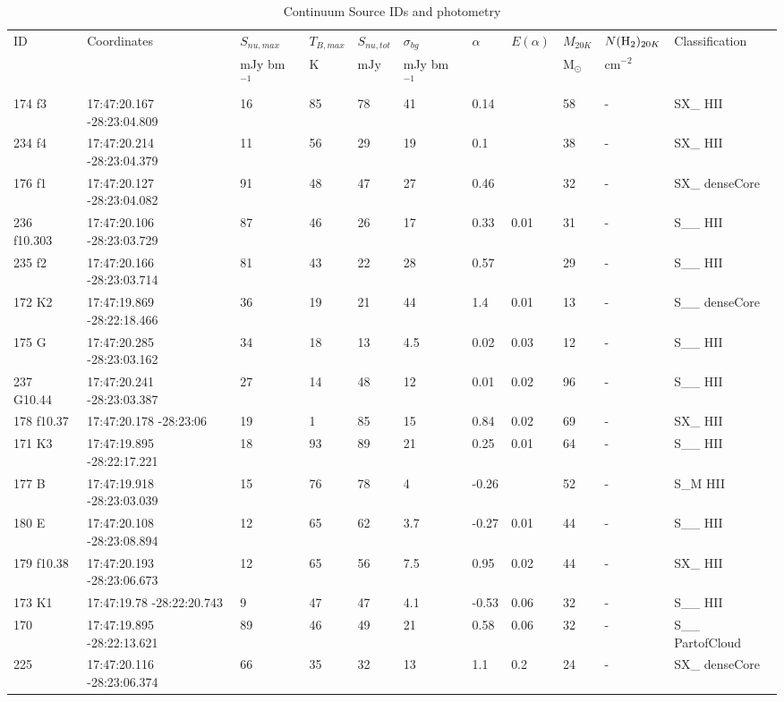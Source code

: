 \begin{table}[htp]
\caption{Continuum Source IDs and photometry}
\begin{tabular}{lllllllllll}
\label{tab:photometry}
\footnotesize
ID & Coordinates & $S_{nu,max}$ & $T_{B,max}$ & $S_{nu,tot}$ & $\sigma_{bg}$ & $\alpha$ & $E(\alpha)$ & $M_{20K}$ & $N(\textrm{H}_{2})_{20 K}$ & Classification \\
 &  & mJy bm$^{-1}$ & $\mathrm{K}$ & $\mathrm{mJy}$ & mJy bm$^{-1}$ &  &  & $\mathrm{M_{\odot}}$ & $\mathrm{cm^{-2}}$ &  \\
\hline
174 f3 & 17:47:20.167 -28:23:04.809 & 16 & 85 & 78 & 41 & 0.14 &  & 58 & - & SX\_ HII \\
234 f4 & 17:47:20.214 -28:23:04.379 & 11 & 56 & 29 & 19 & 0.1 &  & 38 & - & SX\_ HII \\
176 f1 & 17:47:20.127 -28:23:04.082 & 91 & 48 & 47 & 27 & 0.46 &  & 32 & - & SX\_ denseCore \\
236 f10.303 & 17:47:20.106 -28:23:03.729 & 87 & 46 & 26 & 17 & 0.33 & 0.01 & 31 & - & S\_\_ HII \\
235 f2 & 17:47:20.166 -28:23:03.714 & 81 & 43 & 22 & 28 & 0.57 &  & 29 & - & S\_\_ HII \\
172 K2 & 17:47:19.869 -28:22:18.466 & 36 & 19 & 21 & 44 & 1.4 & 0.01 & 13 & - & S\_\_ denseCore \\
175 G & 17:47:20.285 -28:23:03.162 & 34 & 18 & 13 & 4.5 & 0.02 & 0.03 & 12 & - & S\_\_ HII \\
237 G10.44 & 17:47:20.241 -28:23:03.387 & 27 & 14 & 48 & 12 & 0.01 & 0.02 & 96 & - & S\_\_ HII \\
178 f10.37 & 17:47:20.178 -28:23:06 & 19 & 1 & 85 & 15 & 0.84 & 0.02 & 69 & - & SX\_ HII \\
171 K3 & 17:47:19.895 -28:22:17.221 & 18 & 93 & 89 & 21 & 0.25 & 0.01 & 64 & - & S\_\_ HII \\
177 B & 17:47:19.918 -28:23:03.039 & 15 & 76 & 78 & 4 & -0.26 &  & 52 & - & S\_M HII \\
180 E & 17:47:20.108 -28:23:08.894 & 12 & 65 & 62 & 3.7 & -0.27 & 0.01 & 44 & - & S\_\_ HII \\
179 f10.38 & 17:47:20.193 -28:23:06.673 & 12 & 65 & 56 & 7.5 & 0.95 & 0.02 & 44 & - & SX\_ HII \\
173 K1 & 17:47:19.78 -28:22:20.743 & 9 & 47 & 47 & 4.1 & -0.53 & 0.06 & 32 & - & S\_\_ HII \\
170 & 17:47:19.895 -28:22:13.621 & 89 & 46 & 49 & 21 & 0.58 & 0.06 & 32 & - & S\_\_ PartofCloud \\
225 & 17:47:20.116 -28:23:06.374 & 66 & 35 & 32 & 13 & 1.1 & 0.2 & 24 & - & SX\_ denseCore \\

\end{tabular}
\end{table}
